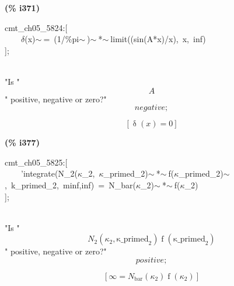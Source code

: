 \documentclass[fleqn]{article}
\begin{document}
\noindent
\begin{minipage}[t]{4.000000em}\color{red}\bfseries
(\% i371)	
\end{minipage}
\begin{minipage}[t]{\textwidth}\color{blue}
cmt\_ch05\_5824:[\\
\ \ \ \ \ensuremath{\delta}(x)\ensuremath{\sim\ }=\ (1/\%pi\ensuremath{\sim\ })\ensuremath{\sim\ }*\ensuremath{\sim\ }limit((sin(A*x)/x),\ x,\ inf)\\
];
\end{minipage}
\mbox{}\\"Is "
\[\displaystyle A\mbox{}
\]" positive, negative or zero?"
\[\displaystyle negative;\mbox{}\]

\[\tag{\% o371} 
\left[ \operatorname{\delta }(x)=0\right] \mbox{}
\]


\noindent
\begin{minipage}[t]{4.000000em}\color{red}\bfseries
(\% i377)	
\end{minipage}
\begin{minipage}[t]{\textwidth}\color{blue}
cmt\_ch05\_5825:[\\
\ \ \ \ 'integrate(N\_2(\ensuremath{\kappa}\_2,\ \ensuremath{\kappa}\_primed\_2)\ensuremath{\sim\ }*\ensuremath{\sim\ }f(\ensuremath{\kappa}\_primed\_2)\ensuremath{\sim\ },\ k\_primed\_2,\ minf,inf)\ =\ N\_bar(\ensuremath{\kappa}\_2)\ensuremath{\sim\ }*\ensuremath{\sim\ }f(\ensuremath{\kappa}\_2)\\
];
\end{minipage}
\mbox{}\\"Is "
\[\displaystyle {N_2}\left( {{\kappa }_2}\operatorname{,}{{\ensuremath{\mathrm{\kappa \_ primed}}}_2}\right)  \operatorname{f}\left( {{\ensuremath{\mathrm{\kappa \_ primed}}}_2}\right) \mbox{}
\]" positive, negative or zero?"
\[\displaystyle positive;\mbox{}\]

\[\tag{\% o377} 
\left[ \infty ={N_{\ensuremath{\mathrm{bar}}}}\left( {{\kappa }_2}\right)  \operatorname{f}\left( {{\kappa }_2}\right) \right] \mbox{}
\]
\end{document}
